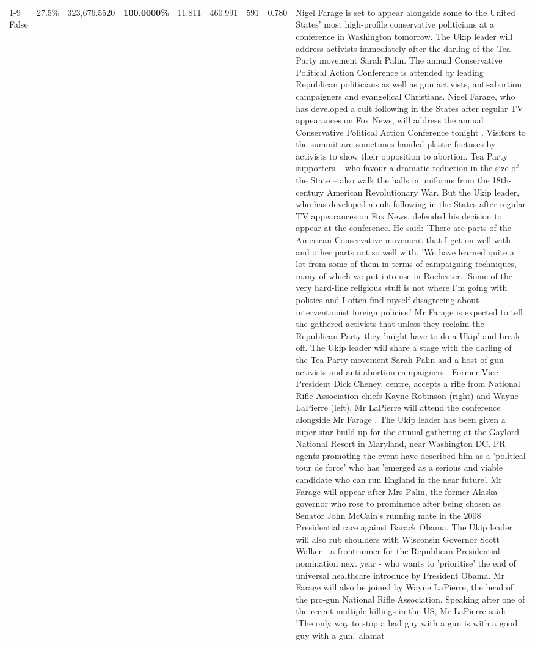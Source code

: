 \begin{table}[H]
\begin{tabular}{lllrlllll}
\cline{1-9}
False & 27.5\% & 323,676.5520 & \bfseries \color{red} 100.0000\% & 11.811 & 460.991 & 591 & 0.780 & Nigel Farage is set to appear alongside some to the United States' most high-profile conservative politicians at a conference in Washington tomorrow. The Ukip leader will address activists immediately after the darling of the Tea Party movement Sarah Palin. The annual Conservative Political Action Conference is attended by leading Republican politicians as well as gun activists, anti-abortion campaigners and evangelical Christians. Nigel Farage, who has developed a cult following in the States after regular TV appearances on Fox News, will address the annual Conservative Political Action Conference tonight . Visitors to the summit are sometimes handed plastic foetuses by activists to show their opposition to abortion. Tea Party supporters – who favour a dramatic reduction in the size of the State – also walk the halls in uniforms from the 18th-century American Revolutionary War. But the Ukip leader, who has developed a cult following in the States after regular TV appearances on Fox News, defended his decision to appear at the conference. He said: 'There are parts of the American Conservative movement that I get on well with and other parts not so well with. 'We have learned quite a lot from some of them in terms of campaigning techniques, many of which we put into use in Rochester. 'Some of the very hard-line religious stuff is not where I'm going with politics and I often find myself disagreeing about interventionist foreign policies.' Mr Farage is expected to tell the gathered activists that unless they reclaim the Republican Party they 'might have to do a Ukip' and break off. The Ukip leader will share a stage with the darling of the Tea Party movement Sarah Palin and a host of gun activists and anti-abortion campaigners . Former Vice President Dick Cheney, centre, accepts a rifle from National Rifle Association chiefs Kayne Robinson (right) and Wayne LaPierre (left). Mr LaPierre will attend the conference alongside Mr Farage . The Ukip leader has been given a super-star build-up for the annual gathering at the Gaylord National Resort in Maryland, near Washington DC. PR agents promoting the event have described him as a 'political tour de force' who has 'emerged as a serious and viable candidate who can run England in the near future'. Mr Farage will appear after Mrs Palin, the former Alaska governor who rose to prominence after being chosen as Senator John McCain's running mate in the 2008 Presidential race against Barack Obama. The Ukip leader will also rub shoulders with Wisconsin Governor Scott Walker - a frontrunner for the Republican Presidential nomination next year - who wants to 'prioritise' the end of universal healthcare introduce by President Obama. Mr Farage will also be joined by Wayne LaPierre, the head of the pro-gun National Rifle Association. Speaking after one of the recent multiple killings in the US, Mr LaPierre said: 'The only way to stop a bad guy with a gun is with a good guy with a gun.' alamat \\

\end{tabular}
\end{table}
